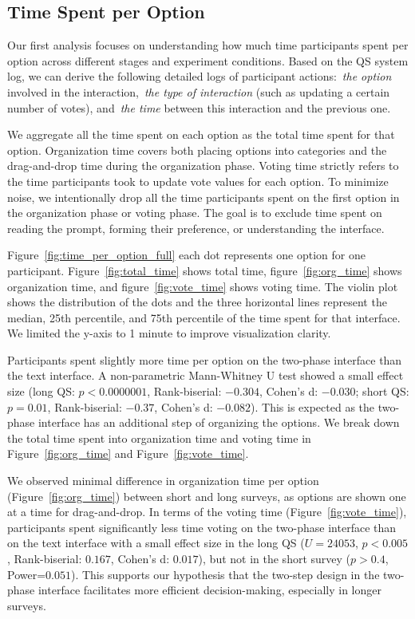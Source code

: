 \subsection{Time Spent per Option}
\label{sec:time_per_option}
Our first analysis focuses on understanding how much time participants spent per option across different stages and experiment conditions. Based on the QS system log, we can derive the following detailed logs of participant actions:~\textit{the option}  involved in the interaction,~\textit{the type of interaction} (such as updating a certain number of votes), and~\textit{the time} between this interaction and the previous one.

We aggregate all the time spent on each option as the total time spent for that option. Organization time covers both placing options into categories and the drag-and-drop time during the organization phase. Voting time strictly refers to the time participants took to update vote values for each option. To minimize noise, we intentionally drop all the time participants spent on the first option in the organization phase or voting phase. The goal is to exclude time spent on reading the prompt, forming their preference, or understanding the interface.

Figure~\ref{fig:time_per_option_full} each dot represents one option for one participant. Figure~\ref{fig:total_time} shows total time, figure~\ref{fig:org_time} shows organization time, and figure~\ref{fig:vote_time} shows voting time. The violin plot shows the distribution of the dots and the three horizontal lines represent the median, 25th percentile, and 75th percentile of the time spent for that interface. We limited the y-axis to 1 minute to improve visualization clarity.

Participants spent slightly more time per option on the two-phase interface than the text interface. A non-parametric Mann-Whitney U test showed a small effect size (long QS: $p<0.0000001$, Rank-biserial: $-0.304$, Cohen's d: $-0.030$; short QS: $p=0.01$, Rank-biserial: $-0.37$, Cohen's d: $-0.082$). This is expected as the two-phase interface has an additional step of organizing the options. We break down the total time spent into organization time and voting time in Figure~\ref{fig:org_time} and Figure~\ref{fig:vote_time}.

We observed minimal difference in organization time per option (Figure~\ref{fig:org_time}) between short and long surveys, as options are shown one at a time for drag-and-drop. In terms of the voting time (Figure~\ref{fig:vote_time}), participants spent significantly less time voting on the two-phase interface than on the text interface with a small effect size in the long QS ($U=24053$, $p<0.005$, Rank-biserial: $0.167$, Cohen's d: $0.017$), but not in the short survey ($p>0.4$, Power=$0.051$). This supports our hypothesis that the two-step design in the two-phase interface facilitates more efficient decision-making, especially in longer surveys.

